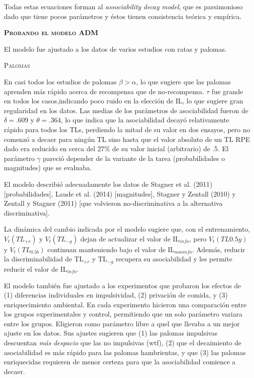 \documentclass[a4paper,12pt]{article}
\begin{document}
Todas estas ecuaciones forman al {\itshape associability decay model}, que es parsimonioso dado que tiene pocos parámetros y éstos tienen consistencia teórica y empírica.

{\scshape\bfseries Probando el modelo ADM}

El modelo fue ajustado a los datos de varios estudios con ratas y palomas.

{\scshape Palomas}

En casi todos los estudios de palomas $\beta > \alpha$, lo que sugiere que las palomas aprenden más rápido acerca de recompensa que de no-recompensa. $\tau$ fue grande en todos los casos,indicando poco ruido en la elección de IL, lo que sugiere gran regularidad en los datos. Las medias de los parámetros de asociabilidad fueron de $\delta = {.}609$ y $\theta = {.}364$, lo que indica que la asociabilidad decayó relativamente rápido para todos los TLs, perdiendo la mitad de su valor en dos ensayos, pero no comenzó a decaer para ningún TL sino hasta que el valor absoluto de un TL RPE dado era reducido en cerca del 27\% de su valor inicial (arbitrario) de .5. El parámetro $\gamma$ pareció depender de la variante de la tarea (probabilidades o magnitudes) que se evaluaba.

El modelo describió adecuadamente los datos de Stagner et al. (2011) [probabilidades], Laude et al. (2014) [magnitudes], Stagner y Zentall (2010) y Zentall y Stagner (2011) [que volvieron no-discriminativa a la alternativa discriminativa].

La dinámica del cambio indicada por el modelo sugiere que, con el entrenamiento, $V_t(TL_{+r})$ y $V_t(TL_{-g})$ dejan de actualizar el valor de IL$_{info}$, pero $V_t(TL{0{.}5y})$ y $V_t(TL_{0{.}5b})$ continuan manteniendo bajo el valor de IL$_{noninfo}$. Además, reducir la discriminabilidad de TL$_{+r}$ y TL$_{-g}$ recupera su asociabilidad y les permite reducir el valor de IL$_{info}$.

El modelo también fue ajustado a los experimentos que probaron los efectos de (1) diferencias individuales en impulsividad, (2) privación de comida, y (3) enriquecimiento ambiental. En cada experimento hicieron una comparación entre los grupos experimentales y control, permitiendo que un solo parámetro variara entre los grupos. Eligieron como parámetro libre a quel que llevaba a un mejor ajuste en los datos. Sus ajustes sugieren que (1) las palomas impulsivas descuentan {\slshape más despacio} que las no impulsivas (wtf), (2) que el decaimiento de asociabilidad es más rápido para las palomas hambrientas, y que (3) las palomas enriquecidas requieren de menor certeza para que la asociabilidad comience a decaer.
\end{document}
